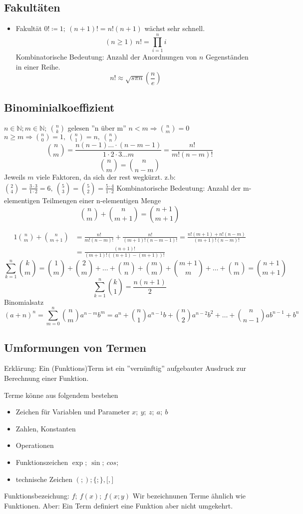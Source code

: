 \documentclass[12pt,a4paper]{article}
\begin{document}
\subsection{Fakultäten}
\begin{itemize}
	\item Fakultät $0! \coloneqq 1;\ (n+1)!=n!(n+1)$ wächst sehr schnell.
	      $$(n \geq 1)\ n! = \prod\limits_{i=1}^n i$$
	      Kombinatorische Bedeutung: Anzahl der Anordnungen von $n$ Gegenständen in einer Reihe.
	      $$n! \approx \sqrt{s \pi n} \left(\frac{n}{e}\right)$$
\end{itemize}
\subsection{Binominialkoeffizient}
$n \in \mathbb{N}; m \in \mathbb{N};\ \binom{n}{k}$  gelesen ''n über m'' $n < m \Rightarrow \binom{n}{m} = 0$ $n \geq m \Rightarrow \binom{n}{0} = 1,\ \binom{n}{1} = n,\ \binom{n}{n}$
$$\binom{n}{m} = \frac{n(n-1) \dots \cdot (n-m-1)}{1\cdot 2\cdot3 \dots m} = \frac{n!}{m!(n-m)!}$$
$$\binom{n}{m}=\binom{n}{n-m}$$ Jeweils $m$ viele Faktoren, da sich der rest wegkürzt.
z.b: $\binom{2}{4} = \frac{3 \cdot 3}{1 \cdot 2} = 6,\ \binom{5}{3} = \binom{5}{2} = \frac{5 \cdot 4}{1 \cdot 2}$
Kombinatorische Bedeutung: Anzahl der m-elementigen Teilmengen einer n-elementigen Menge
$$\binom{n}{m}+\binom{n}{m+1}=\binom{n+1}{m+1}$$

\begin{alignat*}{1}
	\binom{n}{m}+\binom{n}{m+1} & =\frac{n!}{m!(n-m)!}+\frac{n!}{(m+1)!(n-m-1)!}=\frac{n!(m+1)+n!(n-m)}{(m+1)!(n-m)!} \\
	                            & =\frac{(n+1)!}{(m+1)!((n+1)-(m+1))!}
\end{alignat*}
$$\sum\limits_{k=1}^n \binom{k}{m} = \binom{1}{m}+\binom{2}{m}+ \dots + \binom{m}{n}+\binom{m}{m}+\binom{m+1}{m}+\dots+\binom{n}{m}=\binom{n+1}{m+1}$$
$$\sum\limits_{k=1}^n\binom{k}{1} = \frac{n(n+1)}{2}$$
Binomialsatz
$$(a+n)^n=\sum\limits_{m=0}^n\binom{n}{m}a^{n-m}b^m=a^n+\binom{n}{1}a^{n-1}b+\binom{n}{2}a^{n-2}b^2+\dots + \binom{n}{n-1}ab^{n-1}+b^n$$
\subsection{Umformungen von Termen}
Erklärung: Ein (Funktions)Term ist ein ''vernünftig'' aufgebauter Ausdruck zur Berechnung einer Funktion.

Terme könne aus folgendem bestehen
\begin{itemize}
	\item Zeichen für Variablen und Parameter $x;\ y;\ z;\ a;\ b$
	\item Zahlen, Konstanten
	\item Operationen
	\item Funktionszeichen $\exp;\ \sin;\ cos;\ $
	\item technische Zeichen $(;);\lbrace;\rbrace,\lbrack,\rbrack$
\end{itemize}
Funktionsbezeichung: $f;\ f(x);\ f(x;y)$ Wir bezeichnunen Terme ähnlich wie Funktionen. Aber: Ein Term definiert eine Funktion aber nicht umgekehrt.\\
\end{document}
